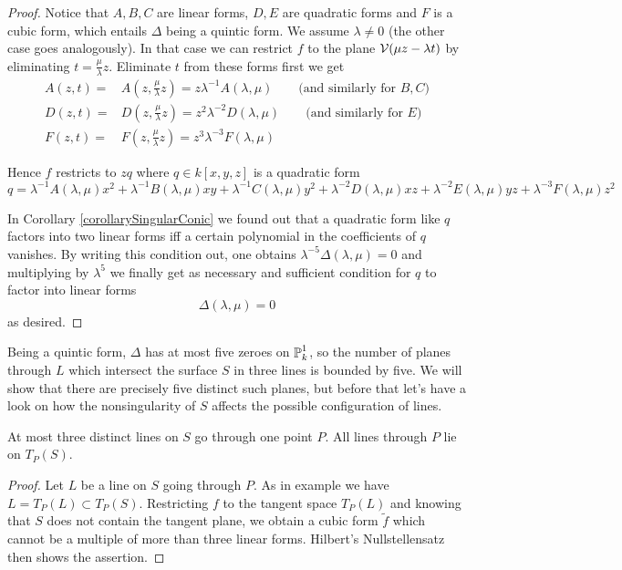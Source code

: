 \begin{proof}
Notice that $A,B,C$ are linear forms, $D,E$ are quadratic forms and $F$ is a cubic form, which entails $\Delta$ being a quintic form.
We assume $\lambda \neq 0$ (the other case goes analogously).
In that case we can restrict $f$ to the plane $\operatorname{\mathcal V}(\mu z - \lambda t)$ by eliminating $t = \frac\mu\lambda z$.
Eliminate $t$ from these forms first we get
\begin{align}
A(z,t) =& A(z,\frac\mu\lambda z) = z\lambda^{-1} A(\lambda,\mu) \qquad \text{(and similarly for $B,C$)} \\
D(z,t) =& D(z,\frac\mu\lambda z) = z^2\lambda^{-2} D(\lambda,\mu) \qquad \text{(and similarly for $E$)} \\
F(z,t) =& F(z,\frac\mu\lambda z) = z^3\lambda^{-3} F(\lambda,\mu)
\end{align}

Hence $f$ restricts to $zq$ where $q \in k[x,y,z]$ is a quadratic form
\begin{equation}
q =
\lambda^{-1} A(\lambda,\mu) x^2
+\lambda^{-1} B(\lambda,\mu) xy
+\lambda^{-1} C(\lambda,\mu) y^2
+\lambda^{-2} D(\lambda,\mu) xz
+\lambda^{-2} E(\lambda,\mu) yz
+\lambda^{-3} F(\lambda,\mu) z^2
\end{equation}

In Corollary \ref{corollarySingularConic} we found out that a quadratic form like $q$ factors into two linear forms iff a certain polynomial in the coefficients of $q$ vanishes.
By writing this condition out, one obtains $\lambda^{-5} \Delta(\lambda,\mu) = 0$ and multiplying by $\lambda^5$ we finally get as necessary and sufficient condition for $q$ to factor into linear forms
\begin{equation}
\Delta(\lambda,\mu) = 0
\end{equation}
as desired.
\end{proof}

Being a quintic form, $\Delta$ has at most five zeroes on $\operatorname{\mathbb P}^1_k$, so the number of planes through $L$ which intersect the surface $S$ in three lines is bounded by five.
We will show that there are precisely five distinct such planes, but before that let's have a look on how the nonsingularity of $S$ affects the possible configuration of lines.

\begin{lemma}
At most three distinct lines on $S$ go through one point $P$.
All lines through $P$ lie on $T_P(S)$.
\end{lemma}
\begin{proof}
Let $L$ be a line on $S$ going through $P$.
As in example \label{exampleTangentPlaneOfLinearSubsets} we have $L = T_P(L) \subset T_P(S)$.
Restricting $f$ to the tangent space $T_P(L)$ and knowing that $S$ does not contain the tangent plane, we obtain a cubic form $\widetilde f$ which cannot be a multiple of more than three linear forms.
Hilbert's Nullstellensatz then shows the assertion.
\end{proof}

